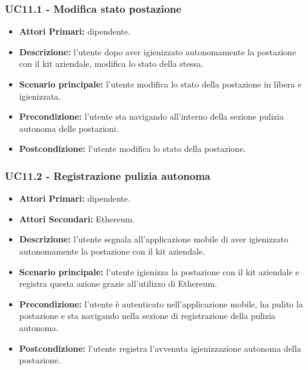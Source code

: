 \subsubsection{ UC11.1 - Modifica stato postazione }
\begin{itemize}
	\item\textbf{Attori Primari:} dipendente.
	\item\textbf{Descrizione:} l’utente dopo aver igienizzato autonomamente la postazione con il kit aziendale, modifica lo stato della stessa.
	\item\textbf{Scenario principale:} l’utente modifica lo stato della postazione in libera e igienizzata.
	\item\textbf{Precondizione:} l’utente sta navigando all'interno della sezione pulizia autonoma delle postazioni.
	\item\textbf{Postcondizione:} l’utente modifica lo stato della postazione.
\end{itemize}

\subsubsection{ UC11.2 - Registrazione pulizia autonoma }
\begin{itemize}
           	\item\textbf{Attori Primari:} dipendente.
           	\item\textbf{Attori Secondari:} Ethereum.
           	\item\textbf{Descrizione:} l’utente segnala all'applicazione mobile di aver igienizzato autonomamente la postazione con il kit aziendale.
           	\item\textbf{Scenario principale:} l’utente igienizza la postazione con il kit aziendale e registra questa azione grazie all'utilizzo di Ethereum.
           	\item\textbf{Precondizione:} l’utente è autenticato nell'applicazione mobile, ha pulito la postazione e sta navigando nella sezione di 
           	registrazione della pulizia autonoma.
           	\item\textbf{Postcondizione:} l’utente registra l'avvenuta igienizzazione autonoma della postazione.
\end{itemize}
